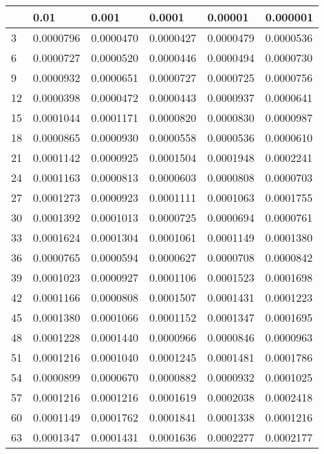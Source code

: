 \documentclass{article}
\begin{document}
\begin{table}[H]
\centering
\begin{tabular}{|l|l|l|l|l|l|}
\hline
& 0.01 & 0.001 & 0.0001 & 0.00001 & 0.000001 \\ \hline
3 & 0.0000796 & 0.0000470 & 0.0000427 & 0.0000479 & 0.0000536 \\ \hline
6 & 0.0000727 & 0.0000520 & 0.0000446 & 0.0000494 & 0.0000730 \\ \hline
9 & 0.0000932 & 0.0000651 & 0.0000727 & 0.0000725 & 0.0000756 \\ \hline
12 & 0.0000398 & 0.0000472 & 0.0000443 & 0.0000937 & 0.0000641 \\ \hline
15 & 0.0001044 & 0.0001171 & 0.0000820 & 0.0000830 & 0.0000987 \\ \hline
18 & 0.0000865 & 0.0000930 & 0.0000558 & 0.0000536 & 0.0000610 \\ \hline
21 & 0.0001142 & 0.0000925 & 0.0001504 & 0.0001948 & 0.0002241 \\ \hline
24 & 0.0001163 & 0.0000813 & 0.0000603 & 0.0000808 & 0.0000703 \\ \hline
27 & 0.0001273 & 0.0000923 & 0.0001111 & 0.0001063 & 0.0001755 \\ \hline
30 & 0.0001392 & 0.0001013 & 0.0000725 & 0.0000694 & 0.0000761 \\ \hline
33 & 0.0001624 & 0.0001304 & 0.0001061 & 0.0001149 & 0.0001380 \\ \hline
36 & 0.0000765 & 0.0000594 & 0.0000627 & 0.0000708 & 0.0000842 \\ \hline
39 & 0.0001023 & 0.0000927 & 0.0001106 & 0.0001523 & 0.0001698 \\ \hline
42 & 0.0001166 & 0.0000808 & 0.0001507 & 0.0001431 & 0.0001223 \\ \hline
45 & 0.0001380 & 0.0001066 & 0.0001152 & 0.0001347 & 0.0001695 \\ \hline
48 & 0.0001228 & 0.0001440 & 0.0000966 & 0.0000846 & 0.0000963 \\ \hline
51 & 0.0001216 & 0.0001040 & 0.0001245 & 0.0001481 & 0.0001786 \\ \hline
54 & 0.0000899 & 0.0000670 & 0.0000882 & 0.0000932 & 0.0001025 \\ \hline
57 & 0.0001216 & 0.0001216 & 0.0001619 & 0.0002038 & 0.0002418 \\ \hline
60 & 0.0001149 & 0.0001762 & 0.0001841 & 0.0001338 & 0.0001216 \\ \hline
63 & 0.0001347 & 0.0001431 & 0.0001636 & 0.0002277 & 0.0002177 \\ \hline

\end{tabular}
\end{table}
\end{document}
